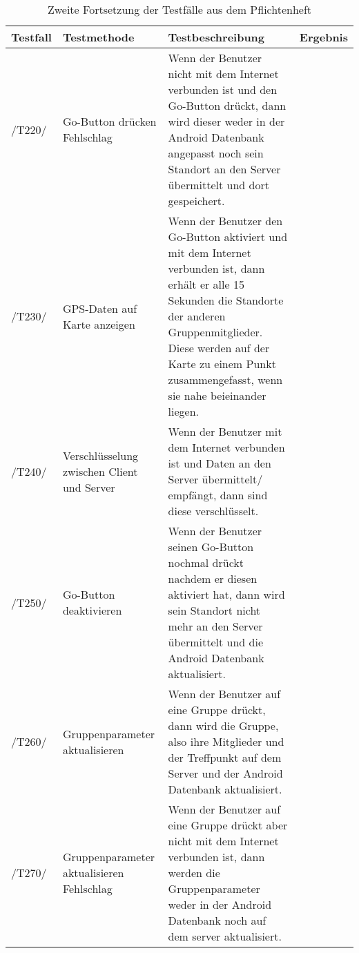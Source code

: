 	\begin{table}[H]
		{
			\begin{tabular}{|p{}||p{}|p{}|>{\centering}p{}|}
				\hline
				Testfall &Testmethode & Testbeschreibung & Ergebnis\tabularnewline
				\hline	
				\hspace{0pt}/T220/ & Go-Button drücken Fehlschlag & Wenn der Benutzer nicht  mit dem Internet verbunden ist und den Go-Button drückt, dann wird dieser weder in der Android Datenbank angepasst noch sein Standort an den Server übermittelt und dort gespeichert. & \checkmark\tabularnewline
				\hspace{0pt}/T230/ & GPS-Daten auf Karte anzeigen & Wenn der Benutzer den Go-Button aktiviert und mit dem Internet verbunden ist, dann erhält er alle 15 Sekunden die Standorte der anderen Gruppenmitglieder. Diese werden auf der Karte zu einem Punkt zusammengefasst, wenn sie nahe beieinander liegen. & \checkmark\tabularnewline
				\hspace{0pt}/T240/ & Verschlüsselung zwischen Client und Server & Wenn der Benutzer mit dem Internet verbunden ist und Daten an den Server übermittelt/ empfängt, dann sind diese verschlüsselt. & \checkmark\tabularnewline
				\hspace{0pt}/T250/ & Go-Button deaktivieren & Wenn der Benutzer seinen Go-Button nochmal drückt nachdem er diesen aktiviert hat, dann wird sein Standort nicht mehr an den Server übermittelt und die Android Datenbank aktualisiert.& \checkmark\tabularnewline		
				\hspace{0pt}/T260/ & Gruppenparameter aktualisieren & Wenn der Benutzer auf eine Gruppe drückt, dann wird die Gruppe, also ihre Mitglieder und der Treffpunkt auf dem Server und der Android Datenbank aktualisiert. & \checkmark\tabularnewline
				\hspace{0pt}/T270/ & Gruppenparameter aktualisieren Fehlschlag & Wenn der Benutzer auf eine Gruppe drückt aber nicht mit dem Internet verbunden ist, dann werden die Gruppenparameter weder in der Android Datenbank noch auf dem server aktualisiert. & \checkmark\tabularnewline
				\hline
			\end{tabular}}
			\caption{Zweite Fortsetzung der Testfälle aus dem Pflichtenheft}
	\end{table}
				


